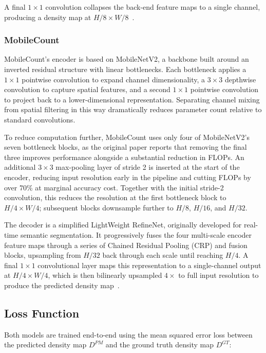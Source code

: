 \documentclass[conference]{IEEEtran}
\begin{document}
A final $1 \times 1$ convolution collapses the back-end feature maps to a single
channel, producing a density map at $H/8 \times W/8$~\cite{li2018csrnet}.

\subsubsection{MobileCount}
MobileCount's encoder is based on MobileNetV2, a backbone built around an
inverted residual structure with linear bottlenecks. Each bottleneck applies a
$1 \times 1$ pointwise convolution to expand channel dimensionality, a
$3 \times 3$ depthwise convolution to capture spatial features, and a second
$1 \times 1$ pointwise convolution to project back to a lower-dimensional
representation. Separating channel mixing from spatial filtering in this way
dramatically reduces parameter count relative to standard convolutions.

To reduce computation further, MobileCount uses only four of MobileNetV2's seven
bottleneck blocks, as the original paper reports that removing the final three
improves performance alongside a substantial reduction in FLOPs. An additional
$3 \times 3$ max-pooling layer of stride 2 is inserted at the start of the
encoder, reducing input resolution early in the pipeline and cutting FLOPs by
over 70\% at marginal accuracy cost. Together with the initial stride-2
convolution, this reduces the resolution at the first bottleneck block to
$H/4 \times W/4$; subsequent blocks downsample further to $H/8$, $H/16$, and
$H/32$.

The decoder is a simplified LightWeight RefineNet, originally developed for
real-time semantic segmentation. It progressively fuses the four multi-scale
encoder feature maps through a series of Chained Residual Pooling (CRP) and
fusion blocks, upsampling from $H/32$ back through each scale until reaching
$H/4$. A final $1 \times 1$ convolutional layer maps this representation to a
single-channel output at $H/4 \times W/4$, which is then bilinearly upsampled
$4\times$ to full input resolution to produce the predicted density
map~\cite{wang2020mobilecount}.

\subsection{Loss Function}

Both models are trained end-to-end using the mean squared error loss between the predicted density map $D^{PM}$ and the ground truth density map $D^{GT}$:
\end{document}
